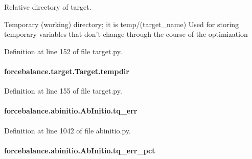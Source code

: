 Relative directory of target. 

Temporary (working) directory; it is temp/(target\-\_\-name) Used for storing temporary variables that don't change through the course of the optimization 

Definition at line 152 of file target.\-py.

\hypertarget{classforcebalance_1_1target_1_1Target_aa1f01b5b78db253b5b66384ed11ed193}{
\paragraph[{tempdir}]{\setlength{\rightskip}{0pt plus 5cm}forcebalance.\-target.\-Target.\-tempdir\hspace{0.3cm}{\ttfamily [inherited]}}}\label{classforcebalance_1_1target_1_1Target_aa1f01b5b78db253b5b66384ed11ed193}


Definition at line 155 of file target.\-py.

\hypertarget{classforcebalance_1_1abinitio_1_1AbInitio_ae60e834d5b5bf13f8fb70d403a97db28}{
\paragraph[{tq\-\_\-err}]{\setlength{\rightskip}{0pt plus 5cm}forcebalance.\-abinitio.\-Ab\-Initio.\-tq\-\_\-err\hspace{0.3cm}{\ttfamily [inherited]}}}\label{classforcebalance_1_1abinitio_1_1AbInitio_ae60e834d5b5bf13f8fb70d403a97db28}


Definition at line 1042 of file abinitio.\-py.

\hypertarget{classforcebalance_1_1abinitio_1_1AbInitio_a184f2a783b2710f6f75842afdeccf14e}{
\paragraph[{tq\-\_\-err\-\_\-pct}]{\setlength{\rightskip}{0pt plus 5cm}forcebalance.\-abinitio.\-Ab\-Initio.\-tq\-\_\-err\-\_\-pct\hspace{0.3cm}{\ttfamily [inherited]}}}\label{classforcebalance_1_1abinitio_1_1AbInitio_a184f2a783b2710f6f75842afdeccf14e}


